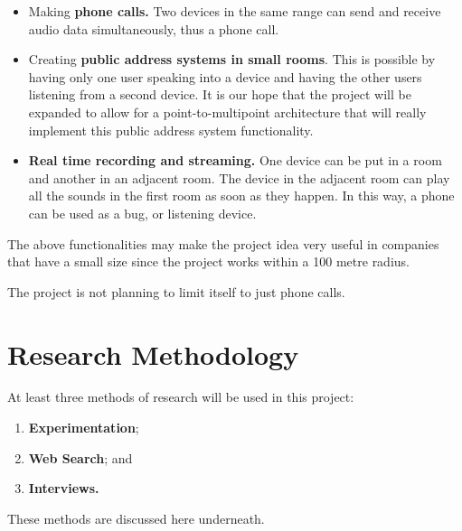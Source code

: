 \documentclass[12pt,svgnames,smaller]{article} %
\begin{document}
	\begin{itemize}
		\item Making \textbf{phone calls.} Two devices in the same range can send and receive audio data simultaneously, thus a phone call. 
		\item Creating \textbf{public address systems in small rooms}. This is possible by having only one user speaking into a device and having the other users listening from a second device. It is our hope that the project will be expanded to allow for a point-to-multipoint architecture that will really implement this public address system functionality.
		\item \textbf{Real time recording and streaming.} One device can be put in a room and another in an adjacent room. The device in the adjacent room can play all the sounds in the first room as soon as they happen. In this way, a phone can be used as a bug, or listening device.
	\end{itemize}
	
	The above functionalities may make the project idea very useful in companies that have a small size since the project works within a 100 metre radius.
	
	The project is not planning to limit itself to just phone calls.
	
	
	\newpage
	\section{\textbf{ Research Methodology} } 
	
	At least three methods of research will be used in this project:
	
	\begin{enumerate}
		\item \textbf{Experimentation};
		\item \textbf{Web Search}; and
		\item \textbf{Interviews.}
	\end{enumerate}
	
	These methods are discussed here underneath.
	
\end{document}
